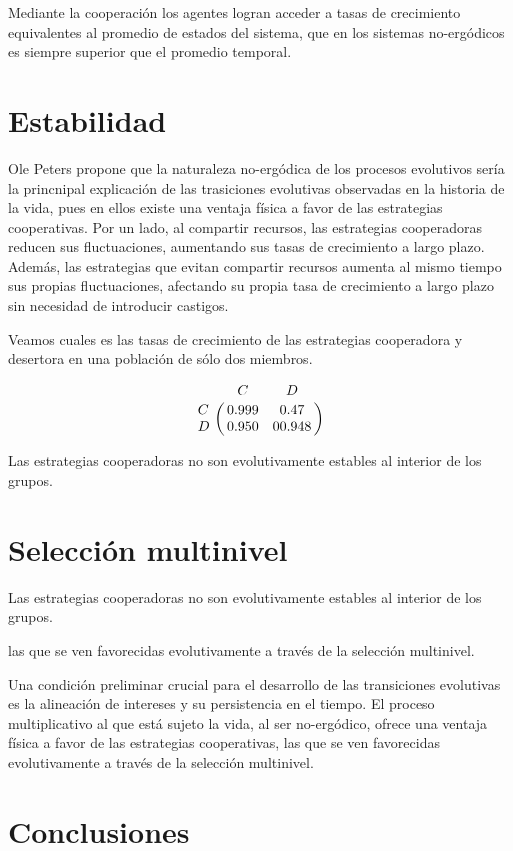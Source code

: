 \documentclass[a4paper,10pt]{article}
\begin{document}
Mediante la cooperación los agentes logran acceder a tasas de crecimiento equivalentes al promedio de estados del sistema, que en los sistemas no-ergódicos es siempre superior que el promedio  temporal.

\section{Estabilidad}

Ole Peters propone que la naturaleza no-ergódica de los procesos evolutivos sería la princnipal explicación de las trasiciones evolutivas observadas en la historia de la vida, pues en ellos existe una ventaja física a favor de las estrategias cooperativas.
Por un lado, al compartir recursos, las estrategias cooperadoras reducen sus fluctuaciones, aumentando sus tasas de crecimiento a largo plazo.
Además, las estrategias que evitan compartir recursos aumenta al mismo tiempo sus propias fluctuaciones, afectando su propia tasa de crecimiento a largo plazo sin necesidad de introducir castigos.

Veamos cuales es las tasas de crecimiento de las estrategias cooperadora y desertora en una población de sólo dos miembros.

\begin{equation}
    \bordermatrix{ & C & D \cr
      C & 0.999 & 0.47 \cr
      D & 0.950 & 0 0.948 } 
\end{equation}

Las estrategias cooperadoras no son evolutivamente estables al interior de los grupos.

\section{Selección multinivel}

Las estrategias cooperadoras no son evolutivamente estables al interior de los grupos.

las que se ven favorecidas evolutivamente a través de la selección multinivel.


Una condición preliminar crucial para el desarrollo de las transiciones evolutivas es la alineación de intereses y su persistencia en el tiempo.
El proceso multiplicativo al que está sujeto la vida, al ser no-ergódico, ofrece una ventaja física a favor de las estrategias cooperativas, las que se ven favorecidas evolutivamente a través de la selección multinivel.

\section{Conclusiones}


{\footnotesize


}
\end{document}
